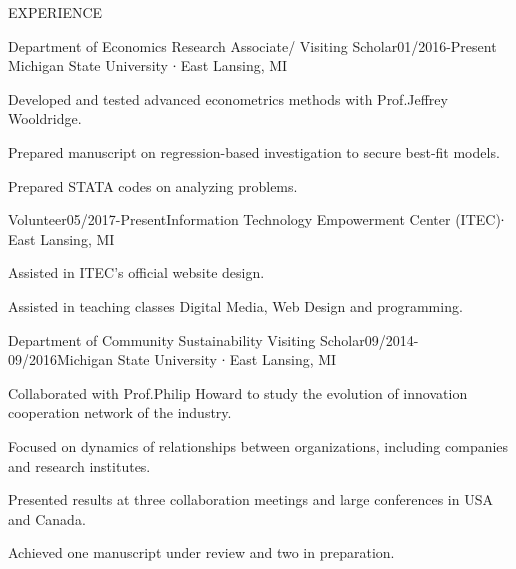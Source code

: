 \documentclass{resume} %
\begin{document}
\begin{minipage}[t]{0.66\textwidth} 



\begin{rSection}{EXPERIENCE}

\begin{rSubsection}{Department of Economics Research Associate/ Visiting Scholar}{01/2016-Present} {Michigan State University ∙ East Lansing, MI} {} 
\item Developed and tested advanced econometrics methods with Prof.Jeffrey Wooldridge. 
\item Prepared manuscript on regression-based investigation to secure best-fit models.
\item Prepared STATA codes on analyzing problems.
\end{rSubsection}



\begin{rSubsection}{Volunteer}{05/2017-Present}{Information Technology Empowerment Center (ITEC)∙ East Lansing, MI} {}
 \item Assisted in ITEC’s official website design.
 \item Assisted in teaching classes Digital Media, Web Design and programming.
\end{rSubsection}



\begin{rSubsection}{Department of Community Sustainability Visiting Scholar}{09/2014-09/2016}{Michigan State University ∙ East Lansing, MI} {}
 \item Collaborated with Prof.Philip Howard to study the evolution of innovation cooperation network of the industry.
 \item Focused on dynamics of relationships between organizations, including companies and research institutes. 
 \item Presented results at three collaboration meetings and large conferences in USA and Canada. 
 \item Achieved one manuscript under review and two in preparation.
\end{rSubsection}



\end{rSection}
\end{minipage}
\end{document}

